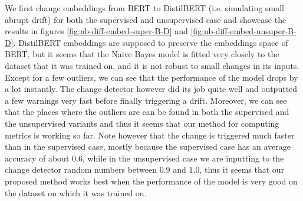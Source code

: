 \documentclass[12pt]{extreport}
\begin{document}
We first change embeddings from BERT to DistilBERT (i.e. simulating small abrupt drift) for both the supervised and unsupervised case and showcase the results in figures \ref{fig:nb-diff-embed-super-B-D} and \ref{fig:nb-diff-embed-unsuper-B-D}. DistilBERT embeddings are supposed to preserve the embeddings space of BERT, but it seems that the Naive Bayes model is fitted very closely to the dataset that it was trained on, and it is not robust to small changes in its inputs. Except for a few outliers, we can see that the performance of the model drops by a lot instantly. The change detector however did its job quite well and outputted a few warnings very fast before finally triggering a drift. Moreover, we can see that the places where the outliers are can be found in both the supervised and the unsupervised variants and thus it seems that our method for computing metrics is working so far. Note however that the change is triggered much faster than in the supervised case, mostly because the supervised case has an average accuracy of about $0.6$, while in the unsupervised case we are inputting to the change detector random numbers between $0.9$ and $1.0$, thus it seems that our proposed method works best when the performance of the model is very good on the dataset on which it was trained on.
\end{document}
